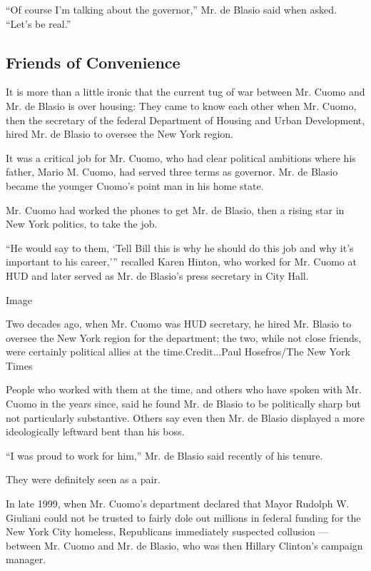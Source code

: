 ``Of course I'm talking about the governor,'' Mr. de Blasio said when
asked. ``Let's be real.''

\hypertarget{friends-of-convenience}{%
\subsection{Friends of Convenience}\label{friends-of-convenience}}

It is more than a little ironic that the current tug of war between Mr.
Cuomo and Mr. de Blasio is over housing: They came to know each other
when Mr. Cuomo, then the secretary of the federal Department of Housing
and Urban Development, hired Mr. de Blasio to oversee the New York
region.

It was a critical job for Mr. Cuomo, who had clear political ambitions
where his father, Mario M. Cuomo, had served three terms as governor.
Mr. de Blasio became the younger Cuomo's point man in his home state.

Mr. Cuomo had worked the phones to get Mr. de Blasio, then a rising star
in New York politics, to take the job.

``He would say to them, `Tell Bill this is why he should do this job and
why it's important to his career,''' recalled Karen Hinton, who worked
for Mr. Cuomo at HUD and later served as Mr. de Blasio's press secretary
in City Hall.

Image

Two decades ago, when Mr. Cuomo was HUD secretary, he hired Mr. Blasio
to oversee the New York region for the department; the two, while not
close friends, were certainly political allies at the time.Credit...Paul
Hosefros/The New York Times

People who worked with them at the time, and others who have spoken with
Mr. Cuomo in the years since, said he found Mr. de Blasio to be
politically sharp but not particularly substantive. Others say even then
Mr. de Blasio displayed a more ideologically leftward bent than his
boss.

``I was proud to work for him,'' Mr. de Blasio said recently of his
tenure.

They were definitely seen as a pair.

In late 1999, when Mr. Cuomo's department declared that Mayor Rudolph W.
Giuliani could not be trusted to fairly dole out millions in federal
funding for the New York City homeless, Republicans immediately
suspected collusion --- between Mr. Cuomo and Mr. de Blasio, who was
then Hillary Clinton's campaign manager.

